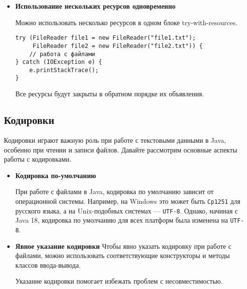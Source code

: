 \begin{itemize}
    \item \textbf{Использование нескольких ресурсов одновременно} \par
    Можно использовать несколько ресурсов в одном блоке try-with-resources.
    \begin{verbatim}
try (FileReader file1 = new FileReader("file1.txt");
     FileReader file2 = new FileReader("file2.txt")) {
    // работа с файлами
} catch (IOException e) {
    e.printStackTrace();
}
    \end{verbatim}
    Все ресурсы будут закрыты в обратном порядке их объявления.
\end{itemize}

\subsection{Кодировки}
Кодировки играют важную роль при работе с текстовыми данными в Java, особенно при чтении и записи файлов. Давайте рассмотрим основные аспекты работы с кодировками. 

\begin{itemize}
    \item \textbf{Кодировка по-умолчанию} \par
    При работе с файлами в Java, кодировка по умолчанию зависит от операционной системы. Например, на Windows это может быть \texttt{Cp1251} для русского языка, а на Unix-подобных системах — \texttt{UTF-8}. Однако, начиная с Java 18, кодировка по умолчанию для всех платформ была изменена на \texttt{UTF-8}.
    
    \item \textbf{Явное указание кодировки}
    Чтобы явно указать кодировку при работе с файлами, можно использовать соответствующие конструкторы и методы классов ввода-вывода. \par
    Указание кодировки помогает избежать проблем с несовместимостью. \par
\end{itemize}

